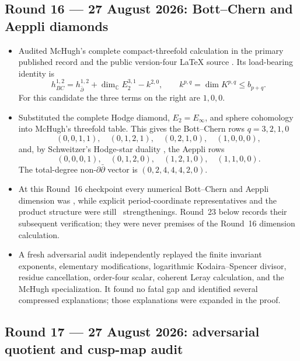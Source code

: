 \subsection*{Round 16 --- 27 August 2026: Bott--Chern and Aeppli diamonds}

\begin{itemize}[leftmargin=1.8em]
\item Audited McHugh's complete compact-threefold calculation in the primary
published record and the public version-four LaTeX source
\cite[Theorem~6.3, Proposition~6.4, equation~(7), \S7.1]{McHugh2019}.
Its load-bearing
identity is
\[
 h^{1,2}_{BC}=h^{1,2}_{\bar\partial}
 +\dim_{\mathbb C}E_2^{3,1}-k^{2,0},
 \qquad k^{p,q}=\dim K^{p,q}\le b_{p+q}.
\]
For this candidate the three terms on the right are $1,0,0$.
\item Substituted the complete Hodge diamond, $E_2=E_\infty$, and sphere
cohomology into McHugh's threefold table.  This gives the Bott--Chern rows
$q=3,2,1,0$
\[
 (0,0,1,1),\quad(0,1,2,1),\quad(0,2,1,0),\quad(1,0,0,0),
\]
and, by Schweitzer's Hodge-star duality
\cite[\S2.c, pp.~9--10]{Schweitzer2007}, the Aeppli rows
\[
 (0,0,0,1),\quad(0,1,2,0),\quad(1,2,1,0),\quad(1,1,0,0).
\]
The total-degree non-$\partial\bar\partial$ vector is
$(0,2,4,4,4,2,0)$.
\item At this Round~16 checkpoint every numerical Bott--Chern and Aeppli
dimension was \Verified, while explicit period-coordinate representatives
and the product structure were still \Open\ strengthenings.  Round~23 below
records their subsequent verification; they were never premises of the
Round~16 dimension calculation.
\item A fresh adversarial audit independently replayed the finite invariant
exponents, elementary modifications, logarithmic Kodaira--Spencer divisor,
residue cancellation, order-four scalar, coherent Leray calculation, and
the McHugh specialization.  It found no fatal gap and identified several
compressed explanations; those explanations were expanded in the proof.
\end{itemize}

\subsection*{Round 17 --- 27 August 2026: adversarial quotient and cusp-map audit}

